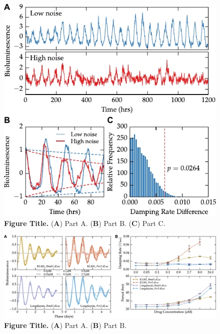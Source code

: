 \documentclass[11pt, letterpaper]{article}
\begin{document}
\begin{figure}[tbp]
  \begin{center}
    \includegraphics[]{figures/pdfs/noise_ts_and_boot.pdf}
  \end{center}
  \caption{{\bfseries Figure Title.}
({\bfseries A}) Part A.
({\bfseries B}) Part B.
({\bfseries C}) Part C.}
\label{fig:fibroblast_noise}
\end{figure}


\begin{figure}[tbp]
  \begin{center}
    \includegraphics[]{figures/pdfs/mainfig_dose.pdf}
  \end{center}
  \caption{{\bfseries Figure Title.}
({\bfseries A}) Part A.
({\bfseries B}) Part B.}
\label{fig:dose_dependence}
\end{figure}
\end{document}
